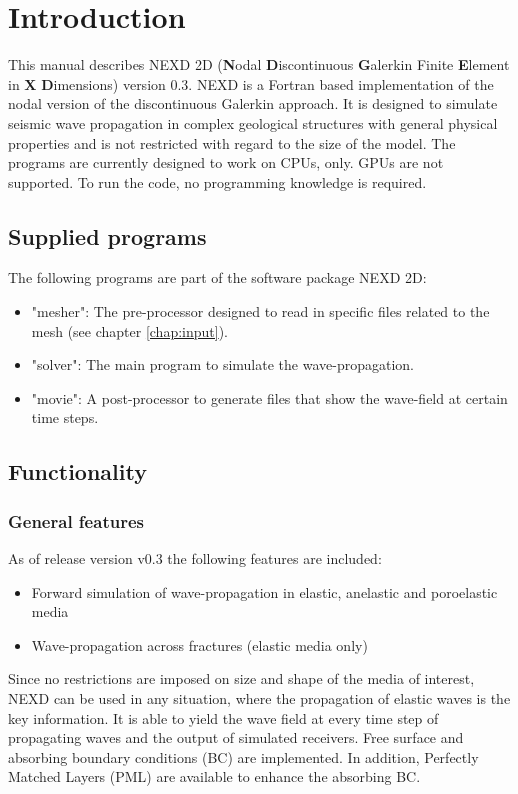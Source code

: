 \chapter{Introduction}
\label{introduction} %

This manual describes NEXD 2D (\textbf{N}odal \textbf{D}iscontinuous \textbf{G}alerkin Finite \textbf{E}lement in \textbf{X} \textbf{D}imensions) version 0.3. NEXD is a Fortran based implementation of the nodal version of the discontinuous Galerkin approach. It is designed to simulate seismic wave propagation in complex geological structures with general physical properties and is not restricted with regard to the size of the model. The programs are currently designed to work on CPUs, only. GPUs are not supported. To run the code, no programming knowledge is required.     
\section{Supplied programs}
	The following programs are part of the software package NEXD 2D:
	\begin{itemize}
		\item "mesher": The pre-processor designed to read in specific files related to the mesh (see chapter \ref{chap:input}).
		\item "solver": The main program to simulate the wave-propagation.
		\item "movie": A post-processor to generate files that show the wave-field at certain time steps.
	\end{itemize}
\section{Functionality}
\label{functions and applications}
	\subsection{General features}    
    As of release version v0.3 the following features are included:
    \begin{itemize}
        \item Forward simulation of wave-propagation in elastic, anelastic and poroelastic media
        \item Wave-propagation across fractures (elastic media only)
    \end{itemize}
    Since no restrictions are imposed on size and shape of the media of interest, NEXD can be used in any situation, where the propagation of elastic waves is the key information. It is able to yield the wave field at every time step of propagating waves and the output of simulated receivers. Free surface and absorbing boundary conditions (BC) are implemented. In addition, Perfectly Matched Layers (PML) \citep{Lambrecht.2017} are available to enhance the absorbing BC.
